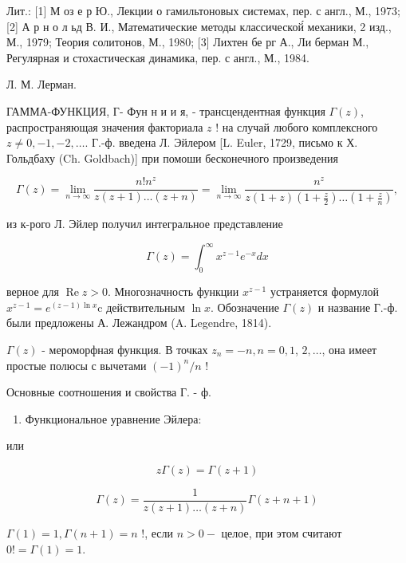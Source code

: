 \documentclass[10pt]{article}
\begin{document}
Лит.: [1] М оз е р Ю., Лекции о гамильтоновых системах, пер. с англ., М., 1973; [2] А р н о л ьд В. И., Математические методы классической́ механики, 2 изд., М., 1979; Теория солитонов, М., 1980; [3] Лихтен бе рг А., Ли берман М., Регулярная и стохастическая динамика, пер. с англ., М., 1984.



Л. М. Лерман.



ГАММА-ФУНКЦИЯ, Г- Фун н и и я, - трансцендентная функция $\Gamma(z)$, распространяющая значения факториала $z$ ! на случай любого комплексного $z \neq 0,-1,-2, \ldots$. Г.-ф. введена Л. Эйлером [L. Euler, 1729, письмо к Х. Гольдбаху (Ch. Goldbach)] при помоши бесконечного произведения



\[

\Gamma(z)=\lim _{n \rightarrow \infty} \frac{n ! n^{z}}{z(z+1) \ldots(z+n)}=\lim _{n \rightarrow \infty} \frac{n^{z}}{z(1+z)\left(1+\frac{z}{2}\right) \ldots\left(1+\frac{z}{n}\right)},

\]



из к-рого Л. Эйлер получил интегральное представление



\[

\Gamma(z)=\int_{0}^{\infty} x^{z-1} e^{-x} d x

\]



верное для $\operatorname{Re} z>0$. Многозначность функции $x^{z-1}$ устраняется формулой $x^{z-1}=e^{(z-1) \ln x} \mathrm{c}$ действительным $\ln x$. Обозначение $\Gamma(z)$ и название Г.-ф. были предложены А. Лежандром (A. Legendre, 1814).



$\Gamma(z)$ - мероморфная функция. В точках $z_{n}=-n, n=0,1$, $2, \ldots$, она имеет простые полюсы с вычетами $(-1)^{n} / n$ !



Основные соотношения и свойства Г. - ф.



\begin{enumerate}

  \item Функциональное уравнение Эйлера:

\end{enumerate}



или



\[

z \Gamma(z)=\Gamma(z+1)

\]



\[

\Gamma(z)=\frac{1}{z(z+1) \ldots(z+n)} \Gamma(z+n+1)

\]



$\Gamma(1)=1, \Gamma(n+1)=n$ !, если $n>0-$ целое, при этом считают $0 !=\Gamma(1)=1$.
\end{document}
